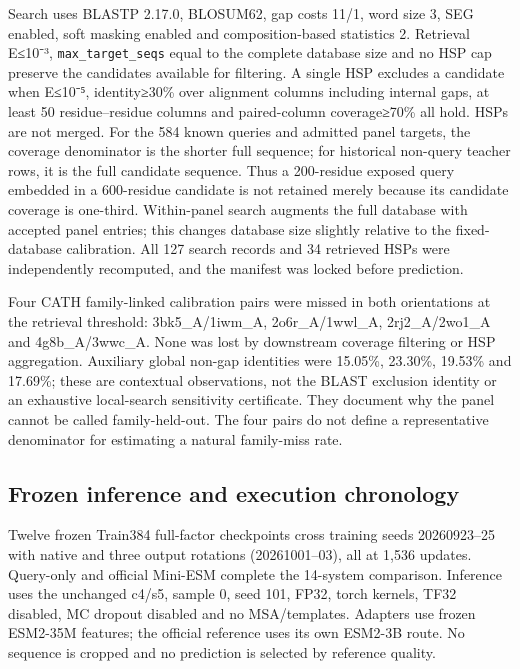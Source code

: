 Search uses BLASTP 2.17.0, BLOSUM62, gap costs 11/1, word size 3, SEG enabled,
soft masking enabled and composition-based statistics 2. Retrieval E≤10⁻³,
\nolinkurl{max_target_seqs} equal to the complete database size and no HSP cap preserve
the candidates available for filtering. A single HSP excludes a candidate when
E≤10⁻⁵, identity≥30\% over alignment columns including internal gaps, at least
50 residue--residue columns and paired-column coverage≥70\% all hold. HSPs are
not merged. For the 584 known queries and admitted panel targets, the coverage
denominator is the shorter full sequence; for historical non-query teacher rows,
it is the full candidate sequence. Thus a 200-residue exposed query embedded in
a 600-residue candidate is not retained merely because its candidate coverage
is one-third. Within-panel search augments the full database with accepted panel
entries; this changes database size slightly relative to the fixed-database
calibration. All 127 search records and 34 retrieved HSPs were independently
recomputed, and the manifest was locked before prediction.

Four CATH family-linked calibration pairs were missed in both orientations at
the retrieval threshold: 3bk5\_A/1iwm\_A, 2o6r\_A/1wwl\_A, 2rj2\_A/2wo1\_A and
4g8b\_A/3wwc\_A. None was lost by downstream coverage filtering or HSP aggregation.
Auxiliary global non-gap identities were 15.05\%, 23.30\%, 19.53\% and 17.69\%; these
are contextual observations, not the BLAST exclusion identity or an exhaustive
local-search sensitivity certificate. They document why the panel cannot be
called family-held-out. The four pairs do not define a representative denominator
for estimating a natural family-miss rate.

\subsection{Frozen inference and execution chronology}\label{frozen-inference-and-execution-chronology}

Twelve frozen Train384 full-factor checkpoints cross training seeds 20260923--25
with native and three output rotations (20261001--03), all at 1,536 updates.
Query-only and official Mini-ESM complete the 14-system comparison. Inference
uses the unchanged c4/s5, sample 0, seed 101, FP32, torch kernels, TF32 disabled,
MC dropout disabled and no MSA/templates. Adapters use frozen ESM2-35M features;
the official reference uses its own ESM2-3B route. No sequence is cropped and no
prediction is selected by reference quality.

